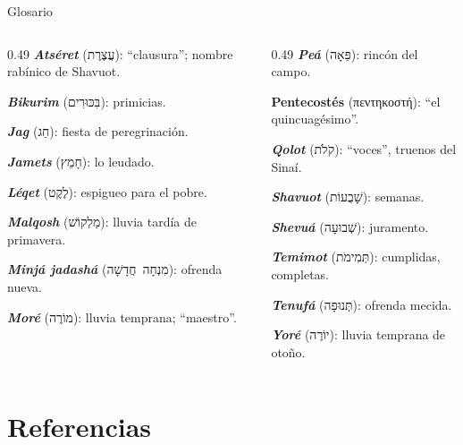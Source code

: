 \documentclass[hyperref={bookmarks=false},aspectratio=169]{beamer}
\newcommand{\heb}[1]{\mbox{\foreignlanguage{hebrew}{#1}}}
\newcommand{\grc}[1]{\foreignlanguage{ancientgreek}{#1}}
\begin{document}
\begin{frame}{Glosario}
\scriptsize
\begin{columns}[t,onlytextwidth]
\begin{column}{0.49\textwidth}\RaggedRight
\textbf{\emph{Atséret}} (\heb{עֲצֶרֶת}): ``clausura''; nombre rabínico de Shavuot.\par\smallskip
\textbf{\emph{Bikurim}} (\heb{בִּכּוּרִים}): primicias.\par\smallskip
\textbf{\emph{Jag}} (\heb{חַג}): fiesta de peregrinación.\par\smallskip
\textbf{\emph{Jamets}} (\heb{חָמֵץ}): lo leudado.\par\smallskip
\textbf{\emph{Léqet}} (\heb{לֶקֶט}): espigueo para el pobre.\par\smallskip
\textbf{\emph{Malqosh}} (\heb{מַלְקוֹשׁ}): lluvia tardía de primavera.\par\smallskip
\textbf{\emph{Minjá jadashá}} (\heb{מִנְחָה חֲדָשָׁה}): ofrenda nueva.\par\smallskip
\textbf{\emph{Moré}} (\heb{מוֹרֶה}): lluvia temprana; ``maestro''.
\end{column}
\begin{column}{0.49\textwidth}\RaggedRight
\textbf{\emph{Peá}} (\heb{פֵּאָה}): rincón del campo.\par\smallskip
\textbf{Pentecostés} (\grc{πεντηκοστή}): ``el quincuagésimo''.\par\smallskip
\textbf{\emph{Qolot}} (\heb{קֹלֹת}): ``voces'', truenos del Sinaí.\par\smallskip
\textbf{\emph{Shavuot}} (\heb{שָׁבֻעוֹת}): semanas.\par\smallskip
\textbf{\emph{Shevuá}} (\heb{שְׁבוּעָה}): juramento.\par\smallskip
\textbf{\emph{Temimot}} (\heb{תְּמִימֹת}): cumplidas, completas.\par\smallskip
\textbf{\emph{Tenufá}} (\heb{תְּנוּפָה}): ofrenda mecida.\par\smallskip
\textbf{\emph{Yoré}} (\heb{יוֹרֶה}): lluvia temprana de otoño.
\end{column}
\end{columns}
\end{frame}

\section{Referencias}
\end{document}
